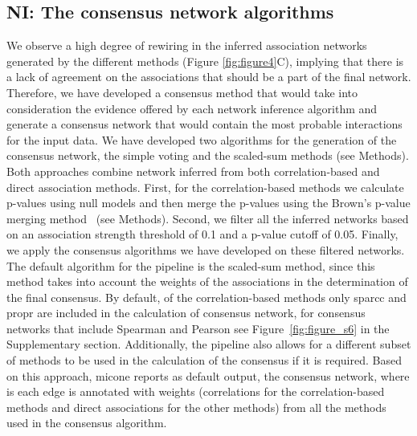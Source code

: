   \FloatBarrier

  \subsection*{NI: The consensus network algorithms}

  We observe a high degree of rewiring in the inferred association networks generated by the different methods (Figure \ref{fig:figure4}C), implying that there is a lack of agreement on the associations that should be a part of the final network.
  Therefore, we have developed a consensus method that would take into consideration the evidence offered by each network inference algorithm and generate a consensus network that would contain the most probable interactions for the input data.
  We have developed two algorithms for the generation of the consensus network, the simple voting and the scaled-sum methods (see Methods).
  Both approaches combine network inferred from both correlation-based and direct association methods.
  First, for the correlation-based methods we calculate p-values using null models and then merge the p-values using the Brown's p-value merging method~\cite{Poole_Gibbs_Shmulevich_Bernard_Knijnenburg_2016,faustCoNetAppInference2016} (see Methods).
  Second, we filter all the inferred networks based on an association strength threshold of 0.1 and a p-value cutoff of 0.05.
  Finally, we apply the consensus algorithms we have developed on these filtered networks.
  The default algorithm for the pipeline is the scaled-sum method, since this method takes into account the weights of the associations in the determination of the final consensus.
  By default, of the correlation-based methods only \ac{sparcc} and propr are included in the calculation of consensus network, for consensus networks that include Spearman and Pearson see Figure~\ref{fig:figure_s6} in the Supplementary section.
  Additionally, the pipeline also allows for a different subset of methods to be used in the calculation of the consensus if it is required.
  Based on this approach, \ac{micone} reports as default output, the consensus network, where is each edge is annotated with weights (correlations for the correlation-based methods and direct associations for the other methods) from all the methods used in the consensus algorithm.

